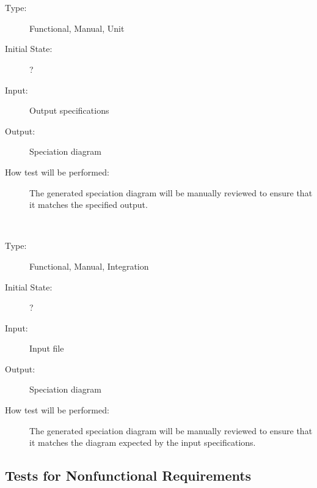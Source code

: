 \documentclass[12pt, titlepage]{article}
\newcounter{testnum} %
\begin{document}
\\
\begin{addmargin}[2em]{0em}
\\
\begin{addmargin}[2em]{0em}
\begin{description}
\item[Type:] Functional, Manual, Unit
					
\item[Initial State:] ?
					
\item[Input:] Output specifications
					
\item[Output:] Speciation diagram
					
\item[How test will be performed:] The generated speciation diagram will be 
manually reviewed to ensure that it matches the specified output.\\
\end{description}
\end{addmargin}

\\
\begin{addmargin}[2em]{0em}
\begin{description}
\item[Type:] Functional, Manual, Integration
					
\item[Initial State:] ?
					
\item[Input:] Input file
					
\item[Output:] Speciation diagram
					
\item[How test will be performed:] The generated speciation diagram will be 
manually reviewed to ensure that it matches the diagram expected by the input 
specifications.\\
\end{description}
\end{addmargin}
\end{addmargin}

\subsection{Tests for Nonfunctional Requirements}
\end{document}
